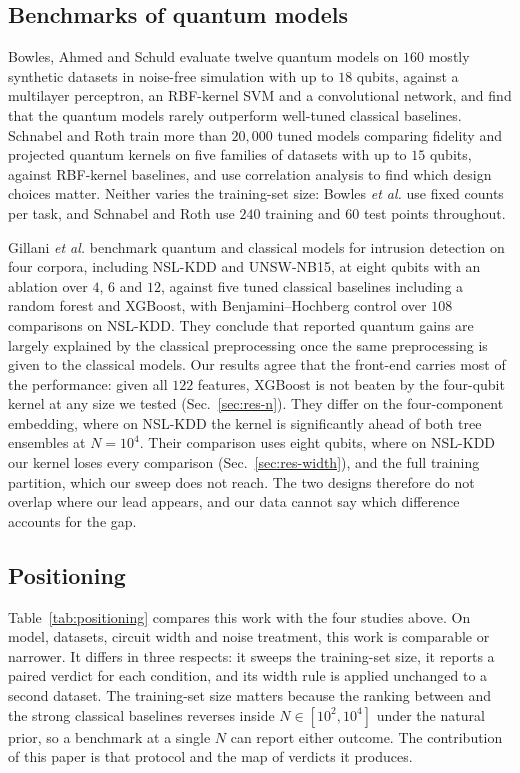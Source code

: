 \subsection{Benchmarks of quantum models}

Bowles, Ahmed and Schuld \cite{bowles2024} evaluate twelve quantum models on $160$ mostly
synthetic datasets in noise-free simulation with up to $18$ qubits, against a multilayer
perceptron, an RBF-kernel SVM and a convolutional network, and find that the quantum models
rarely outperform well-tuned classical baselines. Schnabel and Roth \cite{schnabel2024} train
more than $20{,}000$ tuned models comparing fidelity and projected quantum kernels on five
families of datasets with up to $15$ qubits, against RBF-kernel baselines, and use correlation
analysis to find which design choices matter. Neither varies the training-set size: Bowles
\emph{et al.} use fixed counts per task, and Schnabel and Roth use $240$ training and $60$
test points throughout.

Gillani \emph{et al.} \cite{gillani2026} benchmark quantum and classical models for intrusion
detection on four corpora, including NSL-KDD and UNSW-NB15, at eight qubits with an ablation
over $4$, $6$ and $12$, against five tuned classical baselines including a random forest and
XGBoost, with Benjamini--Hochberg control over $108$ comparisons on NSL-KDD. They conclude that
reported quantum gains are largely explained by the classical preprocessing once the same
preprocessing is given to the classical models. Our results agree that the front-end carries
most of the performance: given all $122$ features, XGBoost is not beaten by the four-qubit
kernel at any size we tested (Sec.~\ref{sec:res-n}). They differ on the four-component
embedding, where on NSL-KDD the kernel is significantly ahead of both tree ensembles at $N=10^4$.
Their comparison uses eight qubits, where on NSL-KDD our kernel loses every comparison
(Sec.~\ref{sec:res-width}), and the full training partition, which our sweep does not reach. The two designs therefore do
not overlap where our lead appears, and our data cannot say which difference accounts for the
gap.

\subsection{Positioning}



Table~\ref{tab:positioning} compares this work with the four studies above. On model, datasets,
circuit width and noise treatment, this work is comparable or narrower. It differs in three
respects: it sweeps the training-set size, it reports a paired verdict for each condition, and
its width rule is applied unchanged to a second dataset. The training-set size matters because
the ranking between \QSVM{} and the strong classical baselines reverses inside
$N\in[10^2,10^4]$ under the natural prior, so a benchmark at a single $N$ can report either
outcome. The contribution of this paper is that protocol and the map of verdicts it produces.

